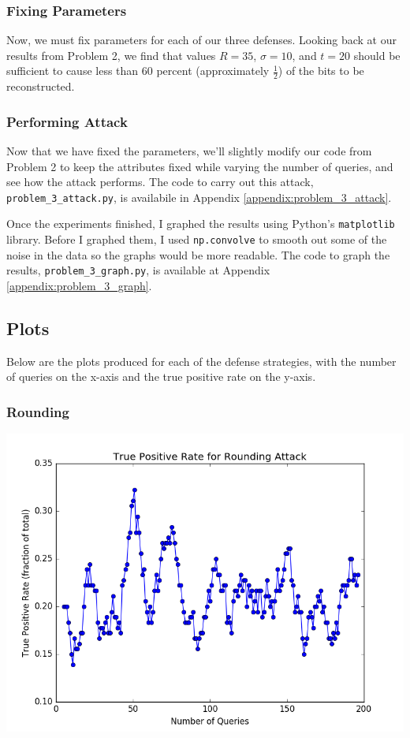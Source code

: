 \documentclass[12pt]{article}
\def\cl{\lstinline}
\begin{document}
\subsubsection{Fixing Parameters}

\noindent

Now, we must fix parameters for each of our three defenses. Looking back at our results from Problem 2, we find that values $R = 35$, $\sigma = 10$, and $t = 20$ should be sufficient to cause less than 60 percent (approximately $\frac{1}{2}$) of the bits to be reconstructed.

\subsubsection{Performing Attack}

\noindent

Now that we have fixed the parameters, we'll slightly modify our code from Problem 2 to keep the attributes fixed while varying the number of queries, and see how the attack performs. The code to carry out this attack, \cl{problem_3_attack.py}, is availabile in Appendix \ref{appendix:problem_3_attack}.

\medskip

Once the experiments finished, I graphed the results using Python's \cl{matplotlib} library. Before I graphed them, I used \cl{np.convolve} to smooth out some of the noise in the data so the graphs would be more readable. The code to graph the results, \cl{problem_3_graph.py}, is available at Appendix \ref{appendix:problem_3_graph}.

\subsection{Plots}

\noindent

Below are the plots produced for each of the defense strategies, with the number of queries on the x-axis and the true positive rate on the y-axis.

\subsubsection{Rounding}
\includegraphics[scale=0.6]{figures/problem_3_rounding_true_positive_rate.png}
\end{document}
